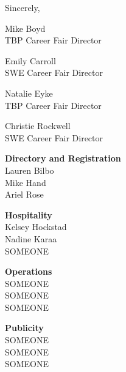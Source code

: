 \documentclass[twoside]{article}
\begin{document}
Sincerely, \begin{multicols}{2}
	\begin{minipage}{\columnwidth}
			Mike Boyd\\
			TBP Career Fair Director\\
			\end{minipage}
\begin{minipage}{\columnwidth}
			Emily Carroll\\
			SWE Career Fair Director\\
			\end{minipage}
\begin{minipage}{\columnwidth}
			Natalie Eyke\\
			TBP Career Fair Director\\
			\end{minipage}
\begin{minipage}{\columnwidth}
			Christie Rockwell\\
			SWE Career Fair Director\\
			\end{minipage}
\end{multicols}\begin{multicols}{2}
	\begin{minipage}{\columnwidth}
	{\bf Directory and Registration}\\
	Lauren Bilbo\\
	Mike Hand\\
	Ariel Rose\\
	
\end{minipage}
	\begin{minipage}{\columnwidth}
	{\bf Hospitality}\\
	Kelsey Hockstad\\
	Nadine Karaa\\
	SOMEONE\\
	
\end{minipage}
	\begin{minipage}{\columnwidth}
	{\bf Operations}\\
	SOMEONE\\
	SOMEONE\\
	SOMEONE\\
	
\end{minipage}
	\begin{minipage}{\columnwidth}
	{\bf Publicity}\\
	SOMEONE\\
	SOMEONE\\
	SOMEONE\\
	

\end{minipage}
\end{multicols}
\end{document}
